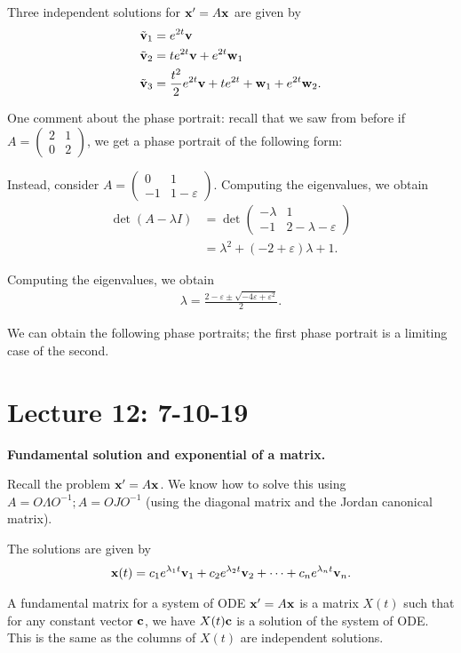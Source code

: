 \documentclass{article}
\newcommand{\mat}[1]{\begin{pmatrix}#1\end{pmatrix}}
\begin{document}
Three independent solutions for $\mathbf{x}' = A \mathbf{x}$ are given by
\begin{align*}
  \tilde{\mathbf{v}}_1 &= e^{2t} \mathbf{v} \\
  \tilde{\mathbf{v}}_2 &= te^{2t} \mathbf{v} + e^{2t} \mathbf{w}_1 \\
  \tilde{\mathbf{v}}_3 &= \frac{t^2}{2} e^{2t} \mathbf{v} + t e^{2t} + \mathbf{w}_1 + e^{2t} \mathbf{w}_2.
\end{align*}

One comment about the phase portrait: recall that we saw from before if $A = \mat{2 & 1 \\ 0 & 2}$, we get a phase portrait of the following form:

Instead, consider $A = \mat{0 & 1 \\ -1 & 1 - \varepsilon}$.  Computing the eigenvalues, we obtain
\begin{align*}
  \det (A - \lambda I) &= \det \mat{- \lambda & 1 \\ - 1 & 2 - \lambda - \varepsilon} \\
  &= \lambda^2 + (-2 + \varepsilon) \lambda + 1.
\end{align*}

Computing the eigenvalues, we obtain
\begin{align*}
  \lambda = \frac{2 - \varepsilon \pm \sqrt{- 4 \varepsilon + \varepsilon^2}}{2}.
\end{align*}

We can obtain the following phase portraits; the first phase portrait is a limiting case of the second.



\section{Lecture 12: 7-10-19}

{\bf Fundamental solution and exponential of a matrix.}

Recall the problem $\mathbf{x}' = A \mathbf{x}$.  We know how to solve this using $A = O \Lambda O^{-1}; A = O JO^{-1}$ (using the diagonal matrix and the Jordan canonical matrix).

The solutions are given by
\begin{align*}
  \mathbf{x}(t) = c_1 e^{\lambda_1 t} \mathbf{v}_1 + c_2 e^{\lambda_2 t} \mathbf{v}_2 + \cdots + c_n e^{\lambda_n t } \mathbf{v}_n.
\end{align*}

\begin{definition}
  A fundamental matrix for a system of ODE $\mathbf{x}' = A \mathbf{x}$ is a matrix $X(t)$ such that for any constant vector $\mathbf{c}$, we have $X(t) \mathbf{c}$ is a solution of the system of ODE.  This is the same as the columns of $X(t)$ are independent solutions. 
\end{definition}
\end{document}
